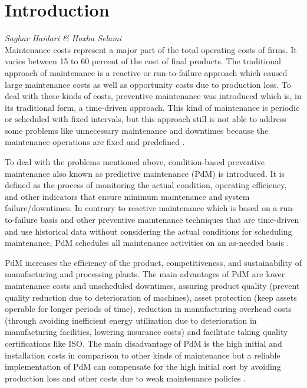 %
\chapter{Introduction}
\label{sec:intro}


\hfill{\normalsize\emph{Saghar Haidari \& Hoxha Selami}} \\
Maintenance costs represent a major part of the total operating costs of firms. It varies between 15 to 60 percent of the cost of final products. The traditional approach of maintenance is a reactive or run-to-failure approach which caused large maintenance costs as well as opportunity costs due to production loss. To deal with these kinds of costs, preventive maintenance was introduced which is, in its traditional form, a time-driven approach. This kind of maintenance is periodic or scheduled with fixed intervals, but this approach still is not able to address some problems like unnecessary maintenance and downtimes because the maintenance operations are fixed and predefined \cite{MOBLEY20021}.

To deal with the problems mentioned above, condition-based preventive maintenance also known as predictive maintenance (PdM) is introduced. It is defined as the process of monitoring the actual condition, operating efficiency, and other indicators that ensure minimum maintenance and system failure/downtimes. In contrary to reactive maintenance which is based on a run-to-failure basis and other preventive maintenance techniques that are time-driven and use historical data without considering the actual conditions for scheduling maintenance, PdM schedules all maintenance activities on an as-needed basis \cite{MOBLEY20021}.

PdM increases the efficiency of the product, competitiveness, and sustainability of manufacturing and processing plants. The main advantages of PdM are lower maintenance costs and unscheduled downtimes, assuring product quality (prevent quality reduction due to deterioration of machines), asset protection (keep assets operable for longer periods of time), reduction in manufacturing overhead costs (through avoiding inefficient energy utilization due to deterioration in manufacturing facilities, lowering insurance costs) and facilitate taking quality certifications like ISO. The main disadvantage of PdM is the high initial and installation costs in comparison to other kinds of maintenance but a reliable implementation of PdM can compensate for the high initial cost by avoiding production loss and other costs due to weak maintenance policies \cite{DBLP:journals/corr/abs-1912-07383,MOBLEY200260}.

